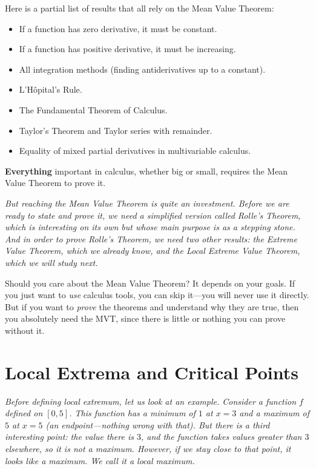 Here is a partial list of results that all rely on the Mean Value Theorem:
\begin{itemize}
  \item If a function has zero derivative, it must be constant.
  \item If a function has positive derivative, it must be increasing.
  \item All integration methods (finding antiderivatives up to a constant).
  \item L'H\^opital's Rule.
  \item The Fundamental Theorem of Calculus.
  \item Taylor's Theorem and Taylor series with remainder.
  \item Equality of mixed partial derivatives in multivariable calculus.
\end{itemize}
\textbf{Everything} important in calculus, whether big or small, requires the Mean Value Theorem to prove it.

\textit{But reaching the Mean Value Theorem is quite an investment.  Before we are ready to state and prove it, we need a simplified version called Rolle's Theorem, which is interesting on its own but whose main purpose is as a stepping stone.  And in order to prove Rolle's Theorem, we need two other results: the Extreme Value Theorem, which we already know, and the Local Extreme Value Theorem, which we will study next.}

\begin{remark}
Should you care about the Mean Value Theorem?  It depends on your goals.  If you just want to \emph{use} calculus tools, you can skip it---you will never use it directly.  But if you want to \emph{prove} the theorems and understand why they are true, then you absolutely need the MVT, since there is little or nothing you can prove without it.
\end{remark}

\section{Local Extrema and Critical Points}
\label{sec:5.2}

\textit{Before defining local extremum, let us look at an example.  Consider a function $f$ defined on $[0,5]$.  This function has a minimum of $1$ at $x = 3$ and a maximum of $5$ at $x = 5$ (an endpoint---nothing wrong with that).  But there is a third interesting point: the value there is $3$, and the function takes values greater than $3$ elsewhere, so it is not a maximum.  However, if we stay close to that point, it looks like a maximum.  We call it a \emph{local} maximum.}

